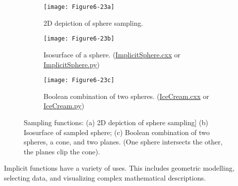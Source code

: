 \begin{figure}[htb]
	\begin{subfigure}[h]{0.32\linewidth}
		\texttt{[image: Figure6-23a]}
		\caption{2D depiction of sphere sampling.}
		\label{fig:Figure6-23a}
	\end{subfigure}
	\begin{subfigure}[h]{0.32\linewidth}
		\texttt{[image: Figure6-23b]}
		\caption{Isosurface of a sphere. (\href{https://lorensen.github.io/VTKExamples/site/Cxx/ImplicitFunctions/ImplicitSphere}{ImplicitSphere.cxx} or \href{https://lorensen.github.io/VTKExamples/site/Python/ImplicitFunctions/ImplicitSphere/}{ImplicitSphere.py})}
		\label{fig:Figure6-23b}
	\end{subfigure}
	\hfill
	\begin{subfigure}[h]{0.32\linewidth}
		\texttt{[image: Figure6-23c]}
		\caption{Boolean combination of two spheres. (\href{https://lorensen.github.io/VTKExamples/site/Cxx/VisualizationAlgorithms/IceCream}{IceCream.cxx} or \href{https://lorensen.github.io/VTKExamples/site/Python/VisualizationAlgorithms/IceCream/}{IceCream.py})}
		\label{fig:Figure6-23c}
	\end{subfigure}
	\caption{Sampling functions: (a) 2D depiction of sphere sampling] (b) Isosurface of sampled sphere; (c) Boolean combination of two spheres, a cone, and two planes. (One sphere intersects the other, the planes clip the cone).}\label{fig:Figure6-23}
\end{figure}

Implicit functions have a variety of uses. This includes geometric modelling, selecting data, and visualizing complex mathematical descriptions.

